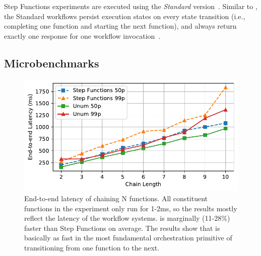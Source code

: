 Step Functions experiments are executed using the \emph{Standard}
version~\cite{aws-step-functions-standard-vs-express}. Similar to \name{}, the
Standard workflows persist execution states on every state transition (i.e.,
completing one function and starting the next function), and always return
exactly one response for one workflow
invocation~\cite{aws-step-functions-exec-gntee}.



\subsection{Microbenchmarks}\label{sec:eval:micro}


\begin{figure}[t!]
    \centering
    \includegraphics[width=\columnwidth]{figures/ChainMicroLatency.pdf}
    \caption{End-to-end latency of chaining N functions. All constituent
    functions in the experiment only run for 1-2ms, so the results mostly
    reflect the latency of the workflow systems. \name{} is marginally
    (11-28\%) faster than Step Functions on average. The results show that
    \name{} is basically as fast in the most fundamental orchestration
    primitive of transitioning from one function to the next.}
    \label{fig:chainmicrolatency}
\end{figure}

